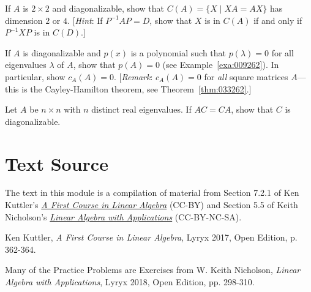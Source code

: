 \documentclass{ximera}
\begin{document}
\begin{problem}
If $A$ is $2 \times 2$ and diagonalizable, show that $C(A) = \{X \mid XA = AX\}$ has dimension $2$ or $4$. [\textit{Hint}: If $P^{-1}AP = D$, show that $X$ is in $C(A)$ if and only if $P^{-1}XP$ is in $C(D)$.]
\end{problem}

\begin{problem}
If $A$ is diagonalizable and $p(x)$ is a polynomial such that $p(\lambda) = 0$ for all eigenvalues $\lambda$ of $A$, show that $p(A) = 0$ (see Example~\ref{exa:009262}). In particular, show $c_{A}(A) = 0$. [\textit{Remark}: $c_{A}(A) = 0$ for \textit{all} square matrices $A$---this is the Cayley-Hamilton theorem, see Theorem~\ref{thm:033262}.]
\end{problem}

\begin{problem}
Let $A$ be $n \times n$ with $n$ distinct real eigenvalues. If $AC = CA$, show that $C$ is diagonalizable.
\end{problem}

\section*{Text Source}
The text in this module is a compilation of material from Section 7.2.1 of Ken Kuttler's \href{https://open.umn.edu/opentextbooks/textbooks/a-first-course-in-linear-algebra-2017}{\it A First Course in Linear Algebra} (CC-BY) and Section 5.5 of Keith Nicholson's \href{https://open.umn.edu/opentextbooks/textbooks/linear-algebra-with-applications}{\it Linear Algebra with Applications} (CC-BY-NC-SA).

Ken Kuttler, {\it  A First Course in Linear Algebra}, Lyryx 2017, Open Edition, p. 362-364.

Many of the Practice Problems are Exercises from 
W. Keith Nicholson, {\it Linear Algebra with Applications}, Lyryx 2018, Open Edition, pp. 298-310.
\end{document}
